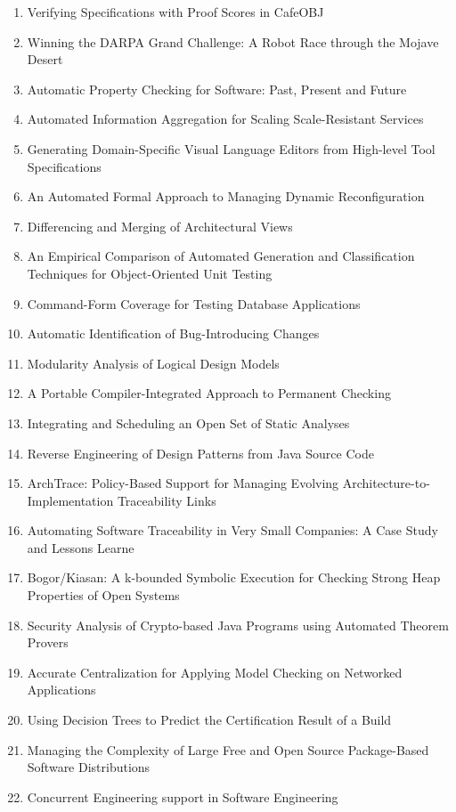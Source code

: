 \begin{enumerate}[itemsep=-1ex]
  \item Verifying Specifications with Proof Scores in CafeOBJ
  \item Winning the DARPA Grand Challenge: A Robot Race through the Mojave Desert
  \item Automatic Property Checking for Software: Past, Present and Future
  \item Automated Information Aggregation for Scaling Scale-Resistant Services
  \item Generating Domain-Specific Visual Language Editors from High-level Tool Specifications
  \item An Automated Formal Approach to Managing Dynamic Reconfiguration
  \item Differencing and Merging of Architectural Views
  \item An Empirical Comparison of Automated Generation and Classification Techniques for Object-Oriented Unit Testing
  \item Command-Form Coverage for Testing Database Applications
  \item Automatic Identification of Bug-Introducing Changes
  \item Modularity Analysis of Logical Design Models
  \item A Portable Compiler-Integrated Approach to Permanent Checking
  \item Integrating and Scheduling an Open Set of Static Analyses
  \item Reverse Engineering of Design Patterns from Java Source Code
  \item ArchTrace: Policy-Based Support for Managing Evolving Architecture-to-Implementation Traceability Links
  \item Automating Software Traceability in Very Small Companies: A Case Study and Lessons Learne
  \item Bogor/Kiasan: A k-bounded Symbolic Execution for Checking Strong Heap Properties of Open Systems
  \item Security Analysis of Crypto-based Java Programs using Automated Theorem Provers
  \item Accurate Centralization for Applying Model Checking on Networked Applications
  \item Using Decision Trees to Predict the Certification Result of a Build
  \item Managing the Complexity of Large Free and Open Source Package-Based Software Distributions
  \item Concurrent Engineering support in Software Engineering

\end{enumerate}
